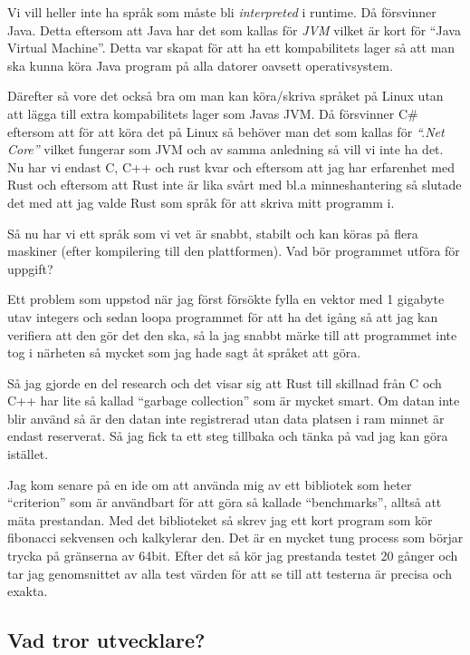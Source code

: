 \documentclass[12pt, a4paper]{report}
\begin{document}
 Vi vill heller inte ha språk som måste bli \textit{interpreted} i runtime. Då försvinner Java. Detta eftersom att Java har det som kallas för \textit{JVM} vilket är kort för ``Java Virtual Machine''. Detta var skapat för att ha ett kompabilitets lager så att man ska kunna köra Java program på alla datorer oavsett operativsystem. 
 
 Därefter så vore det också bra om man kan köra/skriva språket på Linux utan att lägga till extra kompabilitets lager som Javas JVM. Då försvinner C\# eftersom att för att köra det på Linux så behöver man det som kallas för \textit{``.Net Core''} vilket fungerar som JVM och av samma anledning så vill vi inte ha det. Nu har vi endast C, C++ och rust kvar och eftersom att jag har erfarenhet med Rust och eftersom att Rust inte är lika svårt med bl.a minneshantering så slutade det med att jag valde Rust som språk för att skriva mitt programm i.
 
 
Så nu har vi ett språk som vi vet är snabbt, stabilt och kan köras på flera maskiner (efter kompilering till den plattformen). Vad bör programmet utföra för uppgift?

Ett problem som uppstod när jag först försökte fylla en vektor med 1 gigabyte utav integers och sedan loopa programmet för att ha det igång så att jag kan verifiera att den gör det den ska, så la jag snabbt märke till att programmet inte tog i närheten så mycket som jag hade sagt åt språket att göra.

Så jag gjorde en del research och det visar sig att Rust till skillnad från C och C++ har lite så kallad ``garbage collection'' som är mycket smart. Om datan inte blir använd så är den datan inte registrerad utan data platsen i ram minnet är endast reserverat. Så jag fick ta ett steg tillbaka och tänka på vad jag kan göra istället.
 
Jag kom senare på en ide om att använda mig av ett bibliotek som heter ``criterion'' som är användbart för att göra så kallade ``benchmarks'', alltså att mäta prestandan. Med det biblioteket så skrev jag ett kort program som kör fibonacci sekvensen och kalkylerar den. Det är en mycket tung process som börjar trycka på gränserna av 64bit. Efter det så kör jag prestanda testet 20 gånger och tar jag genomsnittet av alla test värden för att se till att testerna är precisa och exakta.
 
 
\subsection{Vad tror utvecklare?}
 
\end{document}
